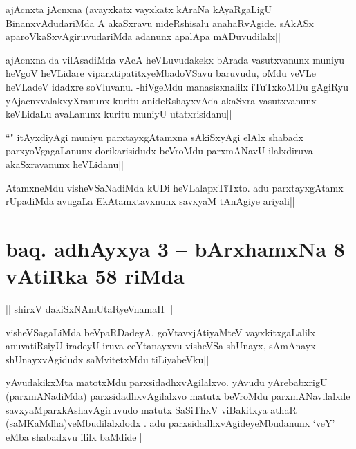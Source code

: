 
\begin{artha}
ajAcnxta jAcnxna (avayxkatx vayxkatx kAraNa kAyaRgaLigU BinanxvAdudariMda A akaSxravu nideRshisalu anahaRvAgide. sAkASx aparoVkaSxvAgiruvudariMda adanunx apalApa mADuvudilalx||
\end{artha}%

\begin{artha}
ajAcnxna da vilAsadiMda vAcA heVLuvudakekx bArada vasutxvanunx muniyu heVgoV heVLidare viparxtipatitxyeMbadoVSavu baruvudu, oMdu veVLe heVLadeV idadxre soVluvanu. -hiVgeMdu manasisxnalilx iTuTxkoMDu gAgiRyu yAjacnxvalakxyXranunx kuritu anideRshayxvAda akaSxra vasutxvanunx keVLidaLu avaLanunx kuritu muniyU utatxrisidanu||
\end{artha}

\stext

\begin{artha}
``\stext " itAyxdiyAgi muniyu parxtayxgAtamxna sAkiSxyAgi elAlx shabadx parxyoVgagaLanunx dorikarisidudx beVroMdu parxmANavU ilalxdiruva akaSxravanunx heVLidanu||
\end{artha}

\begin{artha}
AtamxneMdu visheVSaNadiMda kUDi heVLalapxTiTxto. adu parxtayxgAtamx rUpadiMda avugaLa EkAtamxtavxnunx savxyaM tAnAgiye ariyali||
\end{artha}%

\section*{baq. adhAyxya 3 -- bArxhamxNa 8 vAtiRka 58 riMda}

\begin{center}%
|| shirxV dakiSxNAmUtaRyeVnamaH ||
\end{center}

\begin{artha}
visheVSagaLiMda beVpaRDadeyA, goVtavxjAtiyaMteV vayxkitxgaLalilx anuvatiRsiyU iradeyU iruva ceYtanayxvu visheVSa shUnayx, sAmAnayx shUnayxvAgidudx saMvitetxMdu tiLiyabeVku||
\end{artha}


\begin{artha}
yAvudakikxMta matotxMdu parxsidadhxvAgilalxvo. yAvudu yArebabxrigU (parxmANadiMda) parxsidadhxvAgilalxvo matutx beVroMdu parxmANavilalxde savxyaMparxkAshavAgiruvudo matutx SaSiThxV viBakitxya athaR (saMKaMdha)veMbudilalxdodx . adu parxsidadhxvAgideyeMbudanunx `veY' eMba shabadxvu ililx baMdide||
\end{artha}

